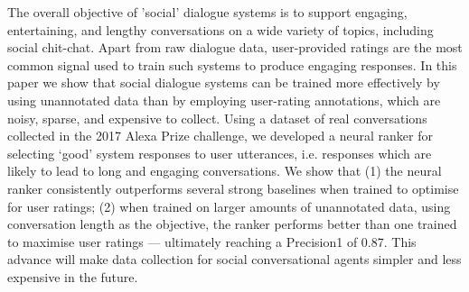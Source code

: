 The overall objective of 'social' dialogue systems is to support engaging, entertaining, and lengthy conversations on a wide variety of topics, including social chit-chat. Apart from raw dialogue data, user-provided ratings are the most common signal used to train such systems to produce engaging responses. In this paper we show that social dialogue systems can be trained more effectively by using unannotated data than by employing user-rating annotations, which are noisy, sparse, and expensive to collect. Using a dataset of real conversations collected in the 2017 Alexa Prize challenge, we developed a neural ranker for selecting `good' system responses to user utterances, i.e. responses which are likely to lead to long and engaging conversations. We show that (1) the neural ranker consistently outperforms several strong baselines when trained to optimise for user ratings; (2) when trained on larger amounts of unannotated data, using conversation length as the objective, the ranker performs better than one trained to maximise user ratings --- ultimately reaching a Precision\@1 of 0.87. This advance will make data collection for social conversational agents simpler and less expensive in the future.
